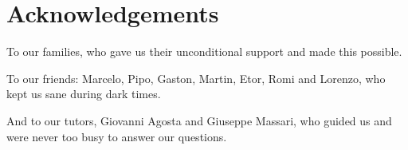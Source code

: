 \chapter*{Acknowledgements}

To our families, who gave us their unconditional support and made this possible.

To our friends: Marcelo, Pipo, Gaston, Martin, Etor, Romi and Lorenzo, who kept us sane during dark times.

And to our tutors, Giovanni Agosta and Giuseppe Massari, who guided us and were never too busy to answer our questions.